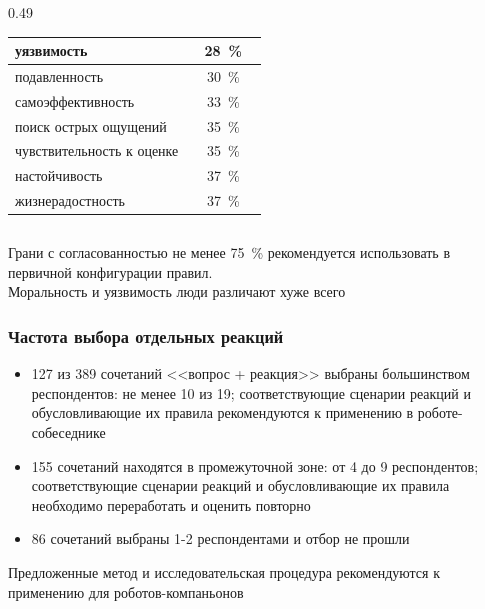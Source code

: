 \documentclass{beamer}
\begin{document}
\begin{frame}
\begin{columns}[T,onlytextwidth]
\begin{column}{0.49\textwidth}
\begin{center}
\begin{tabular}{|p{0.70\linewidth}|c|}
                    уязвимость & 28~\% \\
                    \hline
                    подавленность & 30~\% \\
                    \hline
                    самоэффективность & 33~\% \\
                    \hline
                    поиск острых ощущений & 35~\% \\
                    \hline
                    чувствительность к оценке & 35~\% \\
                    \hline
                    настойчивость & 37~\% \\
                    \hline
                    жизнерадостность & 37~\% \\
                    \hline
                \end{tabular}
            \end{center}
        \end{column}
    \end{columns}

    \vfill
    \small
    Грани с согласованностью не менее 75~\% рекомендуется использовать
    в первичной конфигурации правил. \\
    Моральность и уязвимость люди различают хуже всего
\end{frame}

\begin{frame}
    \frametitle{Частота выбора отдельных реакций}
    \vspace{-0.15cm}
    \begin{figure}
        \centering
        
    \end{figure}

    \vspace{-0.3cm}
    \scriptsize
    \begin{itemize}
        \item[---] 127 из 389 сочетаний <<вопрос + реакция>> выбраны большинством респондентов: не менее 10 из 19; соответствующие сценарии реакций и обусловливающие их правила рекомендуются к применению в роботе-собеседнике
        \item[---] 155 сочетаний находятся в промежуточной зоне: от 4 до 9 респондентов; соответствующие сценарии реакций и обусловливающие их правила необходимо переработать и оценить повторно
        \item[---] 86 сочетаний выбраны 1-2 респондентами и отбор не прошли
    \end{itemize}

    \vfill
    \small
    Предложенные метод и исследовательская процедура рекомендуются к применению для роботов-компаньонов
\end{frame}
\end{document}
